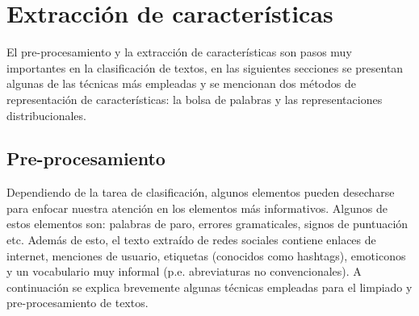 \section{Extracción de características}
El pre-procesamiento y la extracción de características son pasos muy importantes en la clasificación de textos, en las siguientes secciones se presentan algunas de las técnicas más empleadas y se mencionan dos métodos de representación de características: la bolsa de palabras y las representaciones distribucionales.

\subsection{Pre-procesamiento}
Dependiendo de la tarea de clasificación, algunos elementos pueden desecharse para enfocar nuestra atención en los elementos más informativos. Algunos de estos elementos son: palabras de paro, errores gramaticales, signos de puntuación etc. Además de esto, el texto extraído de redes sociales contiene enlaces de internet, menciones de usuario, etiquetas (conocidos como hashtags), emoticonos y un vocabulario muy informal (p.e. abreviaturas no convencionales).  A continuación se explica brevemente algunas técnicas empleadas para el limpiado y pre-procesamiento de textos.


